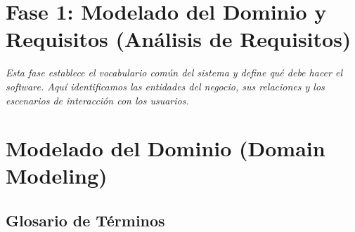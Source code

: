 \documentclass[12pt, a4paper]{article}
\begin{document}
\newpage
\section*{Fase 1: Modelado del Dominio y Requisitos (Análisis de Requisitos)}

\textit{Esta fase establece el vocabulario común del sistema y define qué debe hacer el software. Aquí identificamos las entidades del negocio, sus relaciones y los escenarios de interacción con los usuarios.}

\section{Modelado del Dominio (Domain Modeling)}

\subsection{Glosario de Términos}
\end{document}
